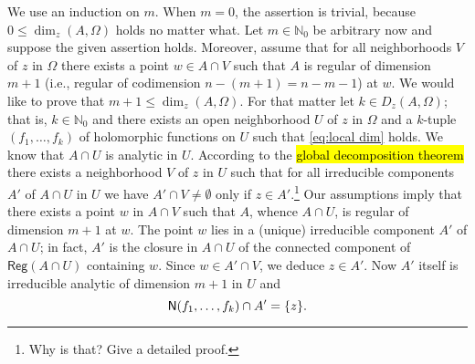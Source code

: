 \documentclass[a4paper]{amsart}
\newcommand{\N}{\mathbb{N}}
\newcommand{\Zero}[1]{\mathsf{N}(#1)}
\newcommand{\Reg}[1]{\mathsf{Reg}(#1)}
\theoremstyle{remark}
\numberwithin{equation}{question}
\DeclarePairedDelimiter\set{\{}{\}}
\begin{document}
\begin{solution}
\begin{solenum}
\item We use an induction on $m$. When $m=0$, the assertion is trivial, because $0 \le \dim_z(A,\Omega)$ holds no matter what. Let $m \in \N_0$ be arbitrary now and suppose the given assertion holds. Moreover, assume that for all neighborhoods $V$ of $z$ in $\Omega$ there exists a point $w \in A \cap V$ such that $A$ is regular of dimension $m+1$ (i.e., regular of codimension $n-(m+1) = n-m-1$) at $w$. We would like to prove that $m+1 \le \dim_z(A,\Omega)$. For that matter let $k \in D_z(A,\Omega)$; that is, $k \in \N_0$ and there exists an open neighborhood $U$ of $z$ in $\Omega$ and a $k$-tuple $(f_1,\dots,f_k)$ of holomorphic functions on $U$ such that \cref{eq:local dim} holds. We know that $A \cap U$ is analytic in $U$. According to the \hl{global decomposition theorem} there exists a neighborhood $V$ of $z$ in $U$ such that for all irreducible components $A'$ of $A \cap U$ in $U$ we have $A' \cap V \ne \emptyset$ only if $z \in A'$.\footnote{Why is that? Give a detailed proof.} Our assumptions imply that there exists a point $w$ in $A \cap V$ such that $A$, whence $A \cap U$, is regular of dimension $m+1$ at $w$. The point $w$ lies in a (unique) irreducible component $A'$ of $A \cap U$; in fact, $A'$ is the closure in $A \cap U$ of the connected component of $\Reg{A \cap U}$ containing $w$. Since $w \in A' \cap V$,  we deduce $z \in A'$. Now $A'$ itself is irreducible analytic of dimension $m+1$ in $U$ and
\[
\Zero{f_1,\dots,f_k} \cap A' = \set z.
\]


\end{solenum}
\end{solution}
\end{document}
